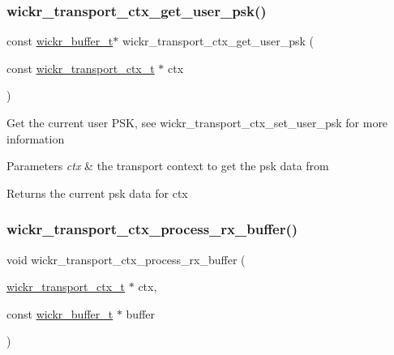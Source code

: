 \subsubsection{\texorpdfstring{wickr\+\_\+transport\+\_\+ctx\+\_\+get\+\_\+user\+\_\+psk()}{wickr\_transport\_ctx\_get\_user\_psk()}}
{\footnotesize\ttfamily const \hyperlink{structwickr__buffer}{wickr\+\_\+buffer\+\_\+t}$\ast$ wickr\+\_\+transport\+\_\+ctx\+\_\+get\+\_\+user\+\_\+psk (\begin{DoxyParamCaption}\item[{const \hyperlink{structwickr__transport__ctx}{wickr\+\_\+transport\+\_\+ctx\+\_\+t} $\ast$}]{ctx }\end{DoxyParamCaption})}

Get the current user P\+SK, see \textquotesingle{}wickr\+\_\+transport\+\_\+ctx\+\_\+set\+\_\+user\+\_\+psk\textquotesingle{} for more information


\begin{DoxyParams}{Parameters}
{\em ctx} & the transport context to get the psk data from \\
\hline
\end{DoxyParams}
\begin{DoxyReturn}{Returns}
the current psk data for \textquotesingle{}ctx\textquotesingle{} 
\end{DoxyReturn}
\mbox{\label{group__wickr__transport__ctx_gad982fd3463a81a667592e18d7bf90822}} 
\subsubsection{\texorpdfstring{wickr\+\_\+transport\+\_\+ctx\+\_\+process\+\_\+rx\+\_\+buffer()}{wickr\_transport\_ctx\_process\_rx\_buffer()}}
{\footnotesize\ttfamily void wickr\+\_\+transport\+\_\+ctx\+\_\+process\+\_\+rx\+\_\+buffer (\begin{DoxyParamCaption}\item[{\hyperlink{structwickr__transport__ctx}{wickr\+\_\+transport\+\_\+ctx\+\_\+t} $\ast$}]{ctx,  }\item[{const \hyperlink{structwickr__buffer}{wickr\+\_\+buffer\+\_\+t} $\ast$}]{buffer }\end{DoxyParamCaption})}

